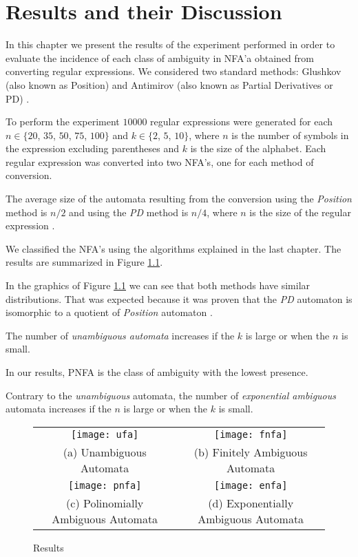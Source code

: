 \chapter{Results and their Discussion}
In this chapter we present the results of the experiment performed in order to evaluate the incidence of each class of ambiguity in NFA'a obtained from converting regular expressions. We considered two standard methods: Glushkov (also known as Position) \cite{glu61} and Antimirov (also known as Partial Derivatives or PD) \cite{Antimirov96}.

To perform the experiment $10000$ regular expressions were generated for each $n \in \{20$, $35$, $50$, $75$, $100\}$ and $k \in \{2$, $5$, $10\}$, where $n$ is the number of symbols in the expression excluding parentheses and $k$ is the size of the alphabet. Each regular expression was converted into two NFA's, one for each method of conversion.


The average size of the automata resulting from the conversion using the \emph{Position} method is $n/2$ and using the \emph{PD} method is $n/4$, where $n$ is the size of the regular expression \cite{BrodaMMR11}.

We classified the NFA's using the algorithms explained in the last chapter. The results are summarized in Figure \ref{fig:results}.

In the graphics of Figure \ref{fig:results} we can see that both methods have similar distributions. That was expected because it was proven that the \emph{PD} automaton is isomorphic to a quotient of \emph{Position} automaton \cite{IlieY03}.

The number of \emph{unambiguous automata} increases if the $k$ is large or when the $n$ is small.

In our results, PNFA is the class of ambiguity with the lowest presence.

Contrary to the \emph{unambiguous} automata, the number of \emph{exponential ambiguous} automata increases if the $n$ is large or when the $k$ is small.

\begin{figure}[]
  \hspace*{-2.3cm}
  \centering
  \begin{tabular}{cc}
    \texttt{[image: ufa]} &   \texttt{[image: fnfa]} \\
  (a) Unambiguous Automata & (b) Finitely Ambiguous Automata \\[6pt]
   \texttt{[image: pnfa]} &   \texttt{[image: enfa]} \\
  (c) Polinomially Ambiguous Automata & (d) Exponentially Ambiguous Automata \\[6pt]
  \end{tabular}
  \caption{Results}
  \label{fig:results}
\end{figure}
